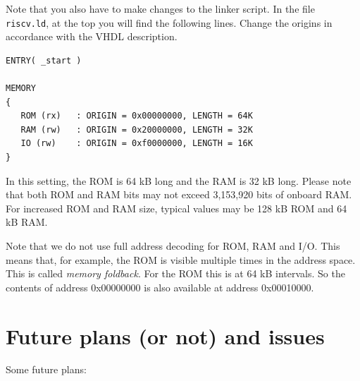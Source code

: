\documentclass[12pt]{article}
\begin{document}
Note that you also have to make changes to the linker script. In the file \texttt{riscv.ld}, at the top you will find the following lines. Change the origins in accordance with the VHDL description.

\begin{lstlisting}
ENTRY( _start )

MEMORY
{
   ROM (rx)   : ORIGIN = 0x00000000, LENGTH = 64K
   RAM (rw)   : ORIGIN = 0x20000000, LENGTH = 32K
   IO (rw)    : ORIGIN = 0xf0000000, LENGTH = 16K
}
\end{lstlisting}

In this setting, the ROM is 64 kB long and the RAM is 32 kB long. Please note that both ROM and RAM bits may not exceed 3,153,920 bits of onboard RAM. For increased ROM and RAM size, typical values may be 128 kB ROM and 64 kB RAM.

Note that we do not use full address decoding for ROM, RAM and I/O. This means that, for example, the ROM is visible multiple times in the address space. This is called \emph{memory foldback}. For the ROM this is at 64 kB intervals. So the contents of address 0x00000000 is also available at address 0x00010000.

\section{Future plans (or not) and issues}
Some future plans:
\end{document}
